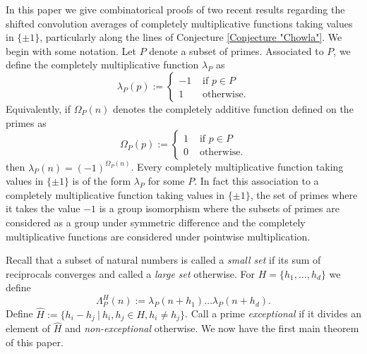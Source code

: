 \documentclass[12pt, a4paper]{amsart}
\theoremstyle{remark}
\theoremstyle{proof}
\numberwithin{equation}{section}
\numberwithin{assumption}{section}
\begin{document}
	In this paper we give combinatorical proofs of two recent results regarding the shifted convolution averages of completely multiplicative functions taking values in $\{\pm 1\}$, particularly along the lines of Conjecture \ref{Conjecture "Chowla"}. We begin with some notation.  Let $P$ denote a subset of primes. Associated to $P$, we define the completely multiplicative function $\lambda_P$ as
	\begin{equation}\label{Equation "lambda_P definition"}
		\lambda_P(p) := \begin{cases}
			-1 &\mbox{ if }p\in P\\
			1&\mbox{ otherwise.}
		\end{cases}
	\end{equation}
	Equivalently, if $\Omega_P(n)$ denotes the completely additive function defined on the primes as
	\begin{equation}\label{Equation "Omega_P definition"}
		\Omega_P(p) := \begin{cases}
			1 &\mbox{ if }p\in P\\
			0&\mbox{ otherwise.}
		\end{cases}
	\end{equation}
	then $\lambda_P(n) = (-1)^{\Omega_P(n)}$. Every completely multiplicative function taking values in $\{\pm 1\}$ is of the form $\lambda_P$ for some $P$. In fact this association to a completely multiplicative function taking values in $\{\pm 1\}$, the set of primes where it takes the value $-1$ is a group isomorphism where the subsets of primes are considered as a group under symmetric difference and the completely multiplicative functions are considered under pointwise multiplication.
	
	Recall that a subset of natural numbers is called a \textit{small set} if its sum of reciprocals converges and called a \textit{large set} otherwise. For $H=\{h_1,\ldots,h_d\}$ we define
	\begin{equation}\label{Equation "Lambda definition"}
		\Lambda_P^H(n):= \lambda_P(n + h_1)\ldots \lambda_P(n+h_d).
	\end{equation}
	Define $\hat{H}:=\{h_i-h_j\ |\ h_i,h_j\in H, h_i\neq h_j\}$. Call a prime \textit{exceptional} if it divides an element of $\hat{H}$ and \textit{non-exceptional} otherwise. We now have the first main theorem of this paper.
	
\end{document}
